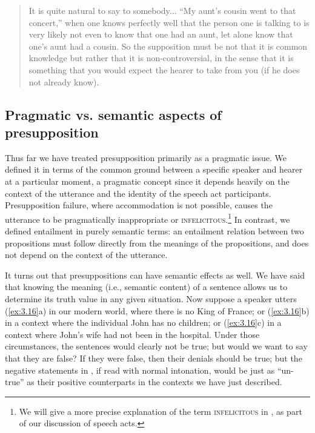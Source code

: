 \begin{quote}
It is quite natural to say to somebody... ``My aunt’s cousin went to that concert,'' when one knows perfectly well that the person one is talking to is very likely not even to know that one had an aunt, let alone know that one’s aunt had a cousin. So the supposition must be not that it is common knowledge but rather that it is non-controversial, in the sense that it is something that you would expect the hearer to take from you (if he does not already know). \citep[190]{Grice1981}
\end{quote}

\subsection{Pragmatic vs. semantic aspects of presupposition}\label{sec:3.4.3}

Thus far we have treated presupposition primarily as a pragmatic issue. We defined it in terms of the common ground between a specific speaker and hearer at a particular moment, a pragmatic concept since it depends heavily on the context of the utterance and the identity of the speech act participants. Presupposition failure, where accommodation is not possible, causes the utterance to be pragmatically inappropriate or \textsc{infelicitous}.\footnote{We will give a more precise explanation of the term \textsc{infelicitous} in , as part of our discussion of speech acts.} In contrast, we defined entailment in purely semantic terms: an entailment relation between two propositions must follow directly from the meanings of the propositions, and does not depend on the context of the utterance.



It turns out that presuppositions can have semantic effects as well. We have said that knowing the meaning (i.e., semantic content) of a sentence allows us to determine its truth value in any given situation. Now suppose a speaker utters (\ref{ex:3.16}a) in our modern world, where there is no King of France; or (\ref{ex:3.16}b) in a context where the individual John has no children; or (\ref{ex:3.16}c) in a context where John’s wife had not been in the hospital. Under those circumstances, the sentences would clearly not be true; but would we want to say that they are false? If they were false, then their denials should be true; but the negative statements in , if read with normal intonation, would be just as “un-true” as their positive counterparts in the contexts we have just described.


